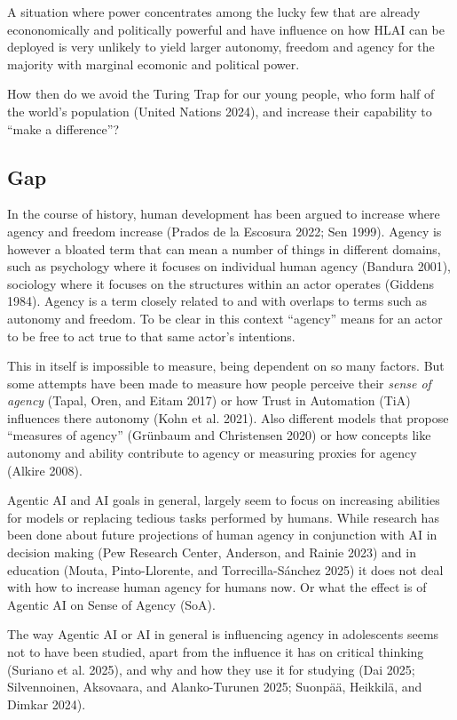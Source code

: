 \documentclass[
  letterpaper,
  DIV=11,
  numbers=noendperiod]{scrartcl}
\begin{document}
A situation where power concentrates among the lucky few that are
already econonomically and politically powerful and have influence on
how HLAI can be deployed is very unlikely to yield larger autonomy,
freedom and agency for the majority with marginal ecomonic and political
power.

How then do we avoid the Turing Trap for our young people, who form half
of the world's population (United Nations 2024), and increase their
capability to ``make a difference''?

\subsection{Gap}\label{gap}

In the course of history, human development has been argued to increase
where agency and freedom increase (Prados de la Escosura 2022; Sen
1999). Agency is however a bloated term that can mean a number of things
in different domains, such as psychology where it focuses on individual
human agency (Bandura 2001), sociology where it focuses on the
structures within an actor operates (Giddens 1984). Agency is a term
closely related to and with overlaps to terms such as autonomy and
freedom. To be clear in this context ``agency'' means for an actor to be
free to act true to that same actor's intentions.

This in itself is impossible to measure, being dependent on so many
factors. But some attempts have been made to measure how people perceive
their \emph{sense of agency} (Tapal, Oren, and Eitam 2017) or how Trust
in Automation (TiA) influences there autonomy (Kohn et al. 2021). Also
different models that propose ``measures of agency'' (Grünbaum and
Christensen 2020) or how concepts like autonomy and ability contribute
to agency or measuring proxies for agency (Alkire 2008).

Agentic AI and AI goals in general, largely seem to focus on increasing
abilities for models or replacing tedious tasks performed by humans.
While research has been done about future projections of human agency in
conjunction with AI in decision making (Pew Research Center, Anderson,
and Rainie 2023) and in education (Mouta, Pinto-Llorente, and
Torrecilla-Sánchez 2025) it does not deal with how to increase human
agency for humans now. Or what the effect is of Agentic AI on Sense of
Agency (SoA).

The way Agentic AI or AI in general is influencing agency in adolescents
seems not to have been studied, apart from the influence it has on
critical thinking (Suriano et al. 2025), and why and how they use it for
studying (Dai 2025; Silvennoinen, Aksovaara, and Alanko-Turunen 2025;
Suonpää, Heikkilä, and Dimkar 2024).
\end{document}
